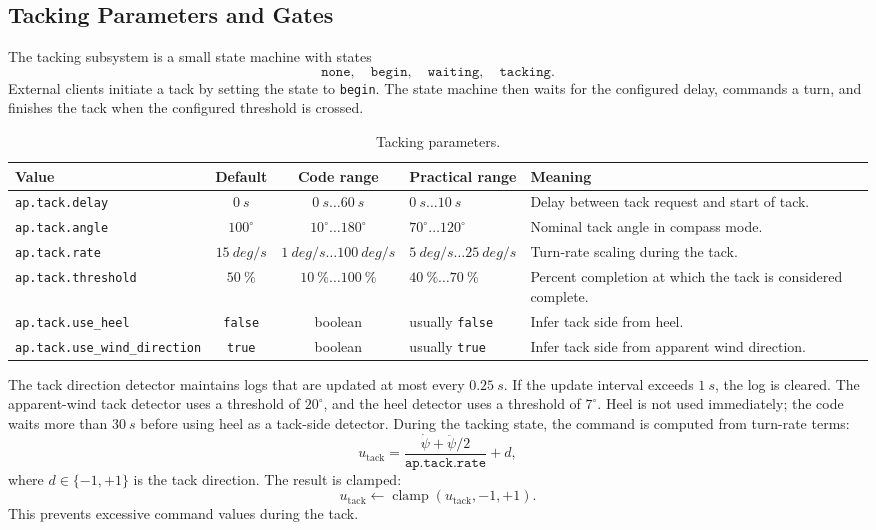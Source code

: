 \documentclass[11pt,twocolumn]{article}
\begin{document}
\subsection{Tacking Parameters and Gates}
The tacking subsystem is a small state machine with states
\[
\texttt{none},\quad
\texttt{begin},\quad
\texttt{waiting},\quad
\texttt{tacking}.
\]
External clients initiate a tack by setting the state to
\texttt{begin}.  The state machine then waits for the configured delay,
commands a turn, and finishes the tack when the configured threshold is
crossed.
\begin{table}[t]
\centering
\caption{Tacking parameters.}
\label{tab:pypilot-tacking-parameters}
\begin{tabularx}{\textwidth}{Z{0.23\textwidth}c c Z{0.16\textwidth}Y}
\toprule
Value & Default & Code range & Practical range & Meaning \\
\midrule
\texttt{ap.tack.delay} &
\(\SI{0}{s}\) &
\(\SI{0}{s}\ldots\SI{60}{s}\) &
\(\SI{0}{s}\ldots\SI{10}{s}\) &
Delay between tack request and start of tack. \\
\texttt{ap.tack.angle} &
\(100^\circ\) &
\(10^\circ\ldots180^\circ\) &
\(70^\circ\ldots120^\circ\) &
Nominal tack angle in compass mode. \\
\texttt{ap.tack.rate} &
\(\SI{15}{deg/s}\) &
\(\SI{1}{deg/s}\ldots\SI{100}{deg/s}\) &
\(\SI{5}{deg/s}\ldots\SI{25}{deg/s}\) &
Turn-rate scaling during the tack. \\
\texttt{ap.tack.threshold} &
\(\SI{50}{\percent}\) &
\(\SI{10}{\percent}\ldots\SI{100}{\percent}\) &
\(\SI{40}{\percent}\ldots\SI{70}{\percent}\) &
Percent completion at which the tack is considered complete. \\
\texttt{ap.tack.use\_heel} &
\texttt{false} &
boolean &
usually \texttt{false} &
Infer tack side from heel. \\
\texttt{ap.tack.use\_wind\_direction} &
\texttt{true} &
boolean &
usually \texttt{true} &
Infer tack side from apparent wind direction. \\
\bottomrule
\end{tabularx}
\end{table}
The tack direction detector maintains logs that are updated at most every
\(\SI{0.25}{s}\).  If the update interval exceeds \(\SI{1}{s}\), the log
is cleared.  The apparent-wind tack detector uses a threshold of
\(20^\circ\), and the heel detector uses a threshold of \(7^\circ\).  Heel
is not used immediately; the code waits more than \(\SI{30}{s}\) before
using heel as a tack-side detector.
During the tacking state, the command is computed from turn-rate terms:
\[
u_{\mathrm{tack}}
=
\frac{\dot{\psi}+\ddot{\psi}/2}
{\texttt{ap.tack.rate}}
+
d,
\]
where \(d\in\{-1,+1\}\) is the tack direction.  The result is clamped:
\[
u_{\mathrm{tack}}
\leftarrow
\operatorname{clamp}(u_{\mathrm{tack}},-1,+1).
\]
This prevents excessive command values during the tack.
\end{document}
